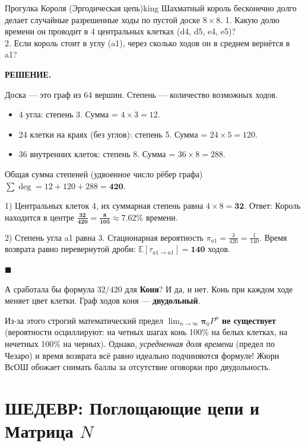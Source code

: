 \documentclass[12pt,a4paper]{article}
\newcommand{\E}{\mathbb{E}}
\newenvironment{solution}{
    \begin{tcolorbox}[
        enhanced, breakable, blanker,
        borderline west={2.5pt}{0pt}{solgray},
        left=12pt, top=5pt, bottom=5pt,
        before skip=10pt, after skip=15pt
    ]
    \textbf{\textsf{РЕШЕНИЕ.}}\;
}{
    \hfill $\blacksquare$
    \end{tcolorbox}
}
\begin{document}
\begin{problem}{Прогулка Короля (Эргодическая цепь)}{king}
Шахматный король бесконечно долго делает случайные разрешенные ходы по пустой доске $8 \times 8$. 
1. Какую долю времени он проводит в 4 центральных клетках (d4, d5, e4, e5)? \\
2. Если король стоит в углу (a1), через сколько ходов он в среднем вернётся в a1?
\end{problem}
\begin{solution}
Доска — это граф из 64 вершин. Степень — количество возможных ходов.
\begin{itemize}
    \item 4 угла: степень 3. Сумма = $4 \times 3 = 12$.
    \item 24 клетки на краях (без углов): степень 5. Сумма = $24 \times 5 = 120$.
    \item 36 внутренних клеток: степень 8. Сумма = $36 \times 8 = 288$.
\end{itemize}
Общая сумма степеней (удвоенное число рёбер графа) $\sum \deg = 12 + 120 + 288 = \mathbf{420}$.

1) Центральных клеток 4, их суммарная степень равна $4 \times 8 = \mathbf{32}$.
Ответ: Король находится в центре $\mathbf{\frac{32}{420} = \frac{8}{105}} \approx 7.62\%$ времени. 

2) Степень угла a1 равна 3. Стационарная вероятность $\pi_{a1} = \frac{3}{420} = \frac{1}{140}$.
Время возврата равно перевернутой дроби: $\E[\tau_{a1 \to a1}] = \mathbf{140}$ ходов. 
\end{solution}

\begin{paradox}
А сработала бы формула $32/420$ для \textbf{Коня}? И да, и нет. 
Конь при каждом ходе меняет цвет клетки. Граф ходов коня — \textbf{двудольный}. 

Из-за этого строгий математический предел $\lim_{n \to \infty} \bm{\pi}_0 P^n$ \textbf{не существует} (вероятности осциллируют: на четных шагах конь 100\% на белых клетках, на нечетных 100\% на черных). 
Однако, \textit{усредненная доля времени} (предел по Чезаро) и время возврата всё равно идеально подчиняются формуле! Жюри ВсОШ обожает снимать баллы за отсутствие оговорки про двудольность.
\end{paradox}

\newpage
\section{ШЕДЕВР: Поглощающие цепи и Матрица $N$}
\end{document}
